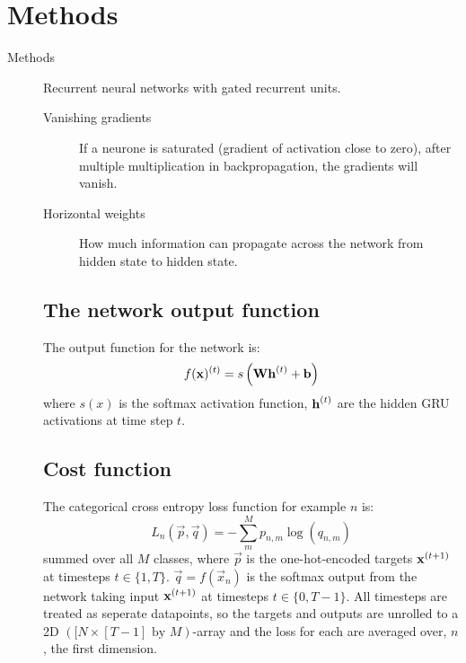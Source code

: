 \section{Methods}
\label{sec:method}

\begin{description}
	\item[Methods] Recurrent neural networks with gated recurrent units.
	
	\begin{description}
		\item[Vanishing gradients] If a neurone is saturated (gradient of activation close to zero), after multiple multiplication in backpropagation, the gradients will vanish.
		\item[Horizontal weights] How much information can propagate across the network from hidden state to hidden state.
	\end{description}
	
	\subsection{The network output function}
	The output function for the network is:
	\begin{equation}
		f(\vec{x})\order{t} = s\left(\vec{W} \vec{h}\order{t} + \vec{b}\right)%
	\end{equation}
	where $s(x)$ is the softmax activation function, $\bm{\mathrm{h}}^{(t)}$ are the hidden GRU activations at time step $t$. 
	\subsection{Cost function} 
	The categorical cross entropy loss function for example $n$ is:
	\begin{equation}
		L_n(\vec{p}, \vec{q}) = -\sum^{M}_{m} p_{n,m} \log (q_{n,m})
	\end{equation}
	summed over all $M$ classes, where $\vec{p}$ is the one-hot-encoded targets $\bm{\mathrm{x}}^{(t+1)}$ at timesteps $t\in\{1, T\}$. $\vec{q}=f(\vec{x}_n)$ is the softmax output from the network taking input $\bm{\mathrm{x}}^{(t+1)}$ at timesteps $t\in\{0, T-1\}$. All timesteps are treated as seperate datapoints, so the targets and outputs are unrolled to a 2D $([N \times [T-1] \text{ by } M)$-array and the loss for each are averaged over, $n$, the first dimension.


\end{description}
